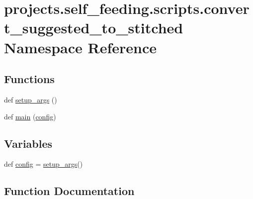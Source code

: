 \hypertarget{namespaceprojects_1_1self__feeding_1_1scripts_1_1convert__suggested__to__stitched}{}\section{projects.\+self\+\_\+feeding.\+scripts.\+convert\+\_\+suggested\+\_\+to\+\_\+stitched Namespace Reference}
\label{namespaceprojects_1_1self__feeding_1_1scripts_1_1convert__suggested__to__stitched}
\subsection*{Functions}
\begin{DoxyCompactItemize}
\item 
def \hyperlink{namespaceprojects_1_1self__feeding_1_1scripts_1_1convert__suggested__to__stitched_abb3be1e61354f80ddbc5d87ffe42e518}{setup\+\_\+args} ()
\item 
def \hyperlink{namespaceprojects_1_1self__feeding_1_1scripts_1_1convert__suggested__to__stitched_a6616af45a9b73cd0314c3d585d66d5f8}{main} (\hyperlink{namespaceprojects_1_1self__feeding_1_1scripts_1_1convert__suggested__to__stitched_a250073634f06e04cf67f20019ab7c905}{config})
\end{DoxyCompactItemize}
\subsection*{Variables}
\begin{DoxyCompactItemize}
\item 
def \hyperlink{namespaceprojects_1_1self__feeding_1_1scripts_1_1convert__suggested__to__stitched_a250073634f06e04cf67f20019ab7c905}{config} = \hyperlink{namespaceprojects_1_1self__feeding_1_1scripts_1_1convert__suggested__to__stitched_abb3be1e61354f80ddbc5d87ffe42e518}{setup\+\_\+args}()
\end{DoxyCompactItemize}


\subsection{Function Documentation}
\mbox{\label{namespaceprojects_1_1self__feeding_1_1scripts_1_1convert__suggested__to__stitched_a6616af45a9b73cd0314c3d585d66d5f8}} 
